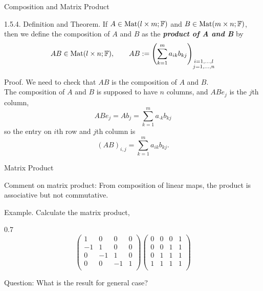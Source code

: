 \documentclass[hyperref={pdfpagelabels=true}]{beamer}
\newcommand{\Mat}{\text{Mat}}
\newcommand{\highlightg}[1]{\textcolor[rgb]{0.1,0.5,0.3}{\emph{\textbf{#1}}}}
\newcommand{\<}{\langle}
\renewcommand{\>}{\rangle}
\newenvironment{shrinkeq}[1]%
{ \bgroup
  \addtolength\abovedisplayshortskip{#1}
  \addtolength\abovedisplayskip{#1}
  \addtolength\belowdisplayshortskip{#1}
  \addtolength\belowdisplayskip{#1}}
{\egroup\ignorespacesafterend}
\begin{document}
\begin{frame}{Composition and Matrix Product}
    \begin{block}{1.5.4. Definition and Theorem.}
    If $A \in \Mat(l \times m;\F)$ and $B \in \Mat(m \times n;\F)$, then we define the composition of $A$ and $B$ as the \highlightg{product of A and B} by
    \begin{shrinkeq}{-0.7em} 
    \[AB \in \Mat(l \times n;\F), \qquad AB:=\left(\sum_{k = 1}^{m}a_{ik}b_{kj}\right)_{\substack{i = 1,...,l\\j = 1,...,n}}\]
    \end{shrinkeq}
    \end{block}
    \begin{block}{Proof.}
        We need to check that $AB$ is the composition of $A$ and $B$.\\
        The composition of $A$ and $B$ is supposed to have $n$ columns, and $ABe_{j}$ is the $j$th column,
        \begin{shrinkeq}{-0.7em}
        \[ABe_{j} = Ab_{j} = \sum_{k = 1}^{m}a_{\cdot k}b_{kj}\]
        \end{shrinkeq}
        so the entry on $i$th row and $j$th column is 
        \begin{shrinkeq}{-0.7em}
        \[(AB)_{i,j} = \sum_{k = 1}^{m}a_{ik}b_{kj}.\]
        \end{shrinkeq}
    \end{block}
\end{frame}
\begin{frame}{Matrix Product}
    \begin{block}{Comment on matrix product:}
        From composition of linear maps, the product is associative but not commutative.\\
    \end{block}
    \begin{block}{Example.}
        Calculate the matrix product,
        \begin{spacing}{0.7}
        \[
            \begin{pmatrix}
                1 & 0 & 0 & 0 \\
                -1 & 1 & 0 & 0 \\
                0 & -1 & 1 & 0 \\
                0 & 0 & -1 & 1 \\
            \end{pmatrix}
            \begin{pmatrix}
                0 & 0 & 0 & 1 \\
                0 & 0 & 1 & 1 \\
                0 & 1 & 1 & 1 \\
                1 & 1 & 1 & 1 \\
            \end{pmatrix}
        \]
        \end{spacing}
    \end{block}
    \begin{block}{Question:}
        What is the result for general case?
    \end{block}
\end{frame}
\end{document}

